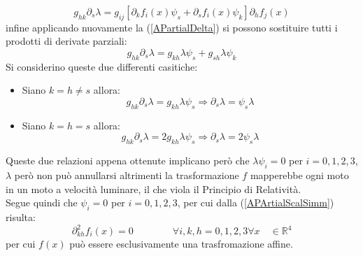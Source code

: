 \begin{equation}
    g_{hk} \partial_s\lambda =g_{ij} \left[\partial_kf_i(x)\psi_s+\partial_sf_i(x)\psi_k\right]\partial_hf_j(x)
\end{equation}    
infine applicando nuovamente la (\ref{APartialDelta}) si possono sostituire tutti i prodotti di derivate parziali:
\begin{equation*}
    g_{hk} \partial_s\lambda =g_{kh}\lambda\psi_s+g_{sh}\lambda \psi_k
\end{equation*}
Si considerino queste due differenti casitiche:
\begin{itemize}
    \item Siano $k=h\neq s$ allora:
    \begin{equation*}
        g_{hk} \partial_s\lambda =g_{kh}\lambda\psi_s \Rightarrow \partial_s\lambda=\psi_s\lambda
    \end{equation*}
    \item Siano $k=h= s$ allora:
    \begin{equation*}
        g_{hk} \partial_s\lambda =2g_{kh}\lambda\psi_s \Rightarrow \partial_s\lambda=2\psi_s\lambda
    \end{equation*}
\end{itemize}
Queste due relazioni appena ottenute implicano però che $\lambda\psi_i=0$ per $i=0,1,2,3$, $\lambda$ però 
non può annullarsi altrimenti la trasformazione $f$ mapperebbe ogni moto in un moto a velocità luminare, il che 
viola il Principio di Relatività.\\
Segue quindi che $\psi_i=0$ per $i=0,1,2,3$, per cui dalla (\ref{APArtialScalSimm}) risulta:
\begin{equation}
    \partial_{kh}^2f_i(x)=0 \qquad \qquad \forall i,k,h=0,1,2,3 \forall x \quad\in \mathbb{R}^4
\end{equation}
per cui $f(x)$ può essere esclusivamente una trasfromazione affine.